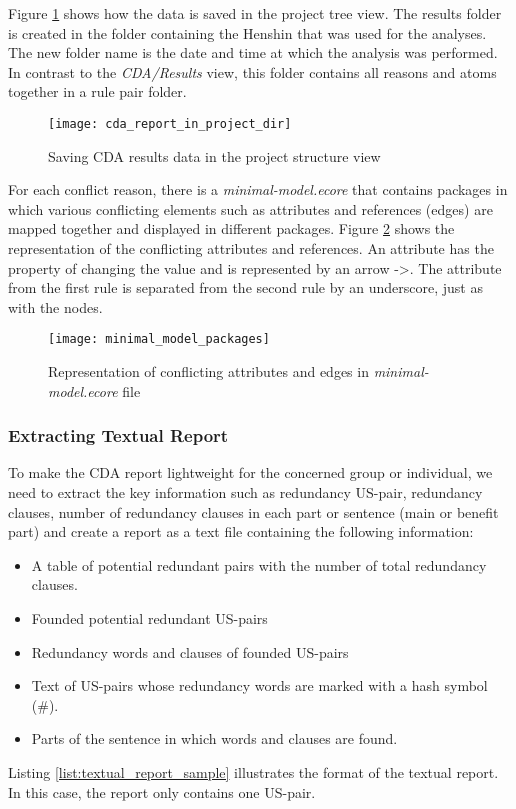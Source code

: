  Figure \ref{fig:cda_report_in_project_dir} shows how the data is saved in the project tree view. The results folder is created in the folder containing the Henshin that was used for the analyses. The new folder name is the date and time at which the analysis was performed. In contrast to the \textit{CDA/Results} view, this folder contains all reasons and atoms together in a rule pair folder.
  \begin{figure}[h]
 	\center
 	\texttt{[image: cda\_report\_in\_project\_dir]}
 	\caption{Saving CDA results data in the project structure view}\label{fig:cda_report_in_project_dir}
 \end{figure}
 
 For each conflict reason, there is a \textit{minimal-model.ecore} that contains packages in which various conflicting elements such as attributes and references (edges) are mapped together and displayed in different packages. Figure \ref{fig:minimal_model_packages} shows the representation of the conflicting attributes and references. An attribute has the property of changing the value and is represented by an arrow -\textgreater. The attribute from the first rule is separated from the second rule by an underscore, just as with the nodes.
  \begin{figure}[h]
 	\center
 	\texttt{[image: minimal\_model\_packages]}
 	\caption{Representation of conflicting attributes and edges in \textit{minimal-model.ecore} file}\label{fig:minimal_model_packages}
 \end{figure}
\subsubsection*{Extracting Textual Report}
To make the CDA report lightweight for the concerned group or individual, we need to extract the key information such as redundancy US-pair, redundancy clauses, number of redundancy clauses in each part or sentence (main or benefit part) and create a report as a text file containing the following information:
\begin{itemize}
	\item A table of potential redundant pairs with the number of total redundancy clauses.
	\item Founded potential redundant US-pairs
	\item Redundancy words and clauses of founded US-pairs
	\item Text of US-pairs whose redundancy words are marked with a hash symbol (\#).
	\item Parts of the sentence in which words and clauses are found.
\end{itemize}
Listing \ref{list:textual_report_sample} illustrates the format of the textual report. In this case, the report only contains one US-pair.

